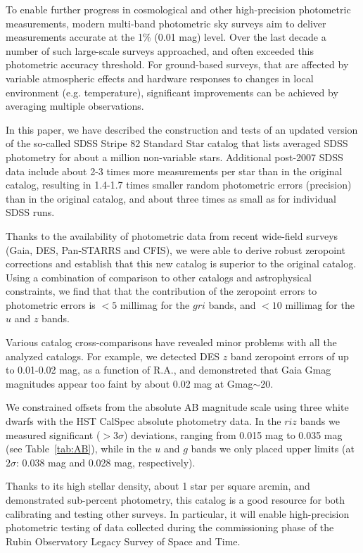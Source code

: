 \documentclass{aastex63}
\begin{document}
To enable further progress in cosmological and other high-precision photometric measurements, 
modern multi-band photometric sky surveys aim to deliver measurements accurate at the 1\% 
(0.01 mag) level. Over the last decade a number of such large-scale surveys approached, and
often exceeded this photometric accuracy threshold. For ground-based surveys, that are 
affected by variable atmospheric effects and hardware responses to changes in local environment
(e.g. temperature), significant improvements can be achieved by averaging multiple observations. 

In this paper, we have described the construction and tests of an updated version of the so-called
SDSS Stripe 82 Standard Star catalog \citep{Ivez07} that lists averaged SDSS photometry for about
a million non-variable stars. Additional post-2007 SDSS data include about 
2-3 times more measurements per star than in the original catalog, resulting in 1.4-1.7 times smaller 
random photometric errors (precision) than in the original catalog, and about three times as small 
as for individual SDSS runs.

Thanks to the availability of photometric data from recent wide-field surveys (Gaia, DES, Pan-STARRS
and CFIS), we were able to derive robust zeropoint corrections and establish that this new catalog
is superior to the original catalog. Using a combination of comparison to other catalogs and 
astrophysical constraints, we find that that the contribution of the zeropoint errors to photometric
errors is $<5$ millimag for the $gri$ bands, and $<10$ millimag for the $u$ and $z$ bands. 

Various catalog cross-comparisons have revealed minor problems with all the analyzed catalogs.
For example, we detected DES $z$ band zeropoint errors of up to 0.01-0.02 mag, as a function 
of R.A., and demonstreted that Gaia Gmag magnitudes appear too faint by about 0.02 mag at
Gmag$\sim$20.
 
We constrained offsets from the absolute AB magnitude scale using three white dwarfs with the 
HST CalSpec absolute photometry data. In the $riz$ bands we measured significant ($>3\sigma$) 
deviations, ranging from 0.015 mag to 0.035 mag (see Table~\ref{tab:AB}), while in the $u$ and $g$ 
bands we only placed upper limits (at $2\sigma$: 0.038 mag and 0.028 mag, respectively).  

Thanks to its high stellar density, about 1 star per square arcmin, and demonstrated sub-percent 
photometry, this catalog is a good resource for both calibrating and testing other surveys. In
particular, it will enable high-precision photometric testing of data collected during the 
commissioning phase of the Rubin Observatory Legacy Survey of Space and Time. 
  
\end{document}
